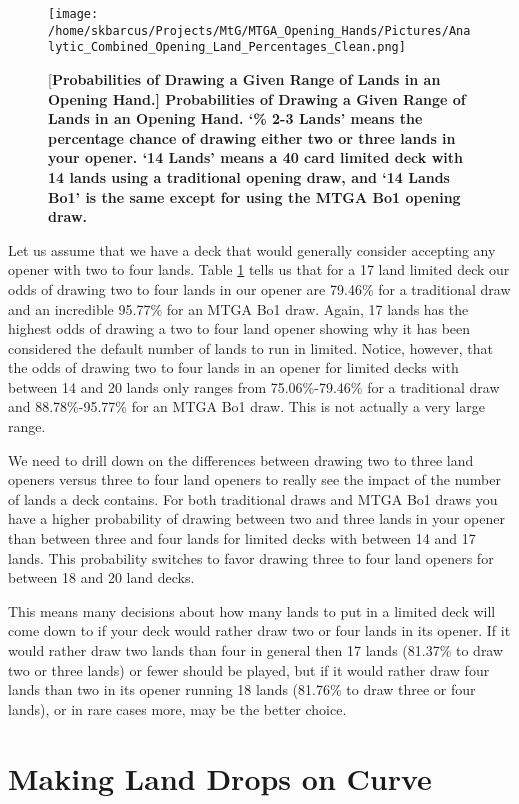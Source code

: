 \documentclass[oneside]{book}   %
\begin{document}
 	\begin{figure}[!ht]
	\centering
	\centerline{\texttt{[image: /home/skbarcus/Projects/MtG/MTGA\_Opening\_Hands/Pictures/Analytic\_Combined\_Opening\_Land\_Percentages\_Clean.png]}}
	[\bf{Probabilities of Drawing a Given Range of Lands in an Opening Hand.}]{
	{\bf{Probabilities of Drawing a Given Range of Lands in an Opening Hand.}} `\% 2-3 Lands' means the percentage chance of drawing either two or three lands in your opener. `14 Lands' means a 40 card limited deck with 14 lands using a traditional opening draw, and `14 Lands Bo1' is the same except for using the MTGA Bo1 opening draw.}
	\label{fig:combined}
	\end{figure}	
	
Let us assume that we have a deck that would generally consider accepting any opener with two to four lands. Table \ref{fig:combined} tells us that for a 17 land limited deck our odds of drawing two to four lands in our opener are 79.46\% for a traditional draw and an incredible 95.77\% for an MTGA Bo1 draw. Again, 17 lands has the highest odds of drawing a two to four land opener showing why it has been considered the default number of lands to run in limited. Notice, however, that the odds of drawing two to four lands in an opener for limited decks with between 14 and 20 lands only ranges from 75.06\%-79.46\% for a traditional draw and 88.78\%-95.77\% for an MTGA Bo1 draw. This is not actually a very large range. 

We need to drill down on the differences between drawing two to three land openers versus three to four land openers to really see the impact of the number of lands a deck contains. For both traditional draws and MTGA Bo1 draws you have a higher probability of drawing between two and three lands in your opener than between three and four lands for limited decks with between 14 and 17 lands. This probability switches to favor drawing three to four land openers for between 18 and 20 land decks. 

This means many decisions about how many lands to put in a limited deck will come down to if your deck would rather draw two or four lands in its opener. If it would rather draw two lands than four in general then 17 lands (81.37\% to draw two or three lands) or fewer should be played, but if it would rather draw four lands than two in its opener running 18 lands (81.76\% to draw three or four lands), or in rare cases more, may be the better choice.  

\section{Making Land Drops on Curve}
\label{curve}
\end{document}
